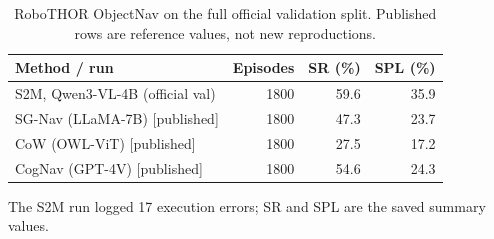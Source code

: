 \begin{table}[t]
\centering
\scriptsize
\caption{Robustness checks on EB-Navigation test (Qwen3-VL-4B; one 300-episode run per condition).}
\label{tab:robust}
\end{table}

\begin{table}[t]
\centering
\small
\caption{RoboTHOR ObjectNav on the full official validation split. Published rows are reference values, not
new reproductions.}
\label{tab:robothor}
\begin{tabular}{lrrr}
\toprule
Method / run & Episodes & SR (\%) & SPL (\%) \\
\midrule
S2M, Qwen3-VL-4B (official val) & 1800 & 59.6 & 35.9 \\
\midrule
SG-Nav (LLaMA-7B) [published] & 1800 & 47.3 & 23.7 \\
CoW (OWL-ViT) [published] & 1800 & 27.5 & 17.2 \\
CogNav (GPT-4V) [published] & 1800 & 54.6 & 24.3 \\
\bottomrule
\end{tabular}

\vspace{0.25em}\footnotesize The S2M run logged 17 execution errors; SR and SPL are the saved summary values.
\end{table}
